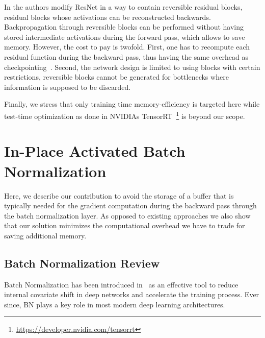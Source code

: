 \documentclass[10pt,twocolumn,letterpaper]{article}
\begin{document}
In \cite{Gomez2017} the authors modify ResNet in a way to contain reversible residual blocks, \ie residual blocks whose activations can be reconstructed backwards. Backpropagation through reversible blocks can be performed without having stored intermediate activations during the forward pass, which allows to save memory. However, the cost to pay is twofold. First, one has to recompute each residual function during the backward pass, thus having the same overhead as checkpointing~\cite{Martens2012}. Second, the network design is limited to using blocks with certain restrictions, \ie reversible blocks cannot be generated for bottlenecks where information is supposed to be discarded. %

Finally, we stress that only training time memory-efficiency is targeted here while test-time optimization as done \eg in NVIDIAs TensorRT~\footnote{\url{https://developer.nvidia.com/tensorrt}} is beyond our scope.




\section{In-Place Activated Batch Normalization}
Here, we describe our contribution to avoid the storage of a buffer that is typically needed for the gradient computation during the backward pass through the batch normalization layer. As opposed to existing approaches we also show that our solution minimizes the computational overhead we have to trade for saving additional memory. %


\subsection{Batch Normalization Review}
Batch Normalization has been introduced in~\cite{IofSze15} as an effective tool to reduce internal covariate shift in deep networks and accelerate the training process.
Ever since, \textsc{BN} plays a key role in most modern deep learning architectures. 
\end{document}
